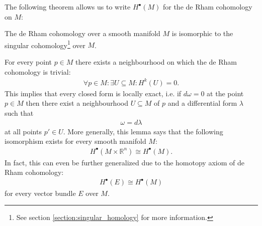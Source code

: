 

    The following theorem allows us to write $H^\bullet(M)$ for the de Rham cohomology on $M$:
    \begin{theorem}[de Rham]
        The de Rham cohomology over a smooth manifold $M$ is isomorphic to the singular cohomology\footnote{See section \ref{section:singular_homology} for more information.} over $M$.
    \end{theorem}

    \begin{theorem}\label{diff:poincare}
         For every point $p\in M$ there exists a neighbourhood on which the de Rham cohomology is trivial:
        \begin{gather}
            \forall p\in M:\exists U\subseteq M: H^k(U) = 0.
        \end{gather}
        This implies that every closed form is locally exact, i.e. if $d\omega=0$ at the point $p\in M$ then there exist a neighbourhood $U\subseteq M$ of $p$ and a differential form $\lambda$ such that
        \begin{gather}
            \omega = d\lambda
        \end{gather}
        at all points $p'\in U$. More generally, this lemma says that the following isomorphism exists for every smooth manifold $M$:
        \begin{gather}
            H^\bullet(M\times\mathbb{R}^n) \cong H^\bullet(M).
        \end{gather}
        In fact, this can even be further generalized due to the homotopy axiom of de Rham cohomology:
        \begin{gather}
            H^\bullet(E) \cong H^\bullet(M)
        \end{gather}
        for every vector bundle $E$ over $M$.
    \end{theorem}

